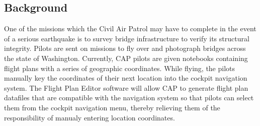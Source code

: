 \documentclass[12pt, letterpaper]{article}
\begin{document}
\subsection{Background}
One of the missions which the Civil Air Patrol may have to complete in the event of a serious earthquake is to survey bridge infrastructure to verify its structural integrity.  Pilots are sent on missions to fly over and photograph bridges across the state of Washington.  Currently, CAP pilots are given notebooks containing flight plans with a series of geographic coordinates.  While flying, the pilots manually key the coordinates of their next location into the cockpit navigation system.  The Flight Plan Editor software will allow CAP to generate flight plan datafiles that are compatible with the navigation system so that pilots can select them from the cockpit navigation menu, thereby relieving them of the responsibility of manualy entering location coordinates.



{}

\end{document}
